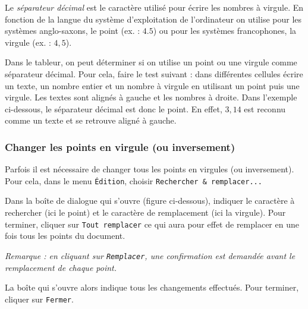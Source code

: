 Le \emph{séparateur décimal} est le caractère utilisé pour écrire les nombres à virgule. En fonction de la langue du système d'exploitation de l'ordinateur on utilise pour les systèmes anglo-saxons, le point (ex. : $4.5$) ou pour les systèmes francophones, la virgule (ex. : $4,5$).

\vspace{6pt}

Dans le tableur, on peut déterminer si on utilise un point ou une virgule comme séparateur décimal. Pour cela, faire le test suivant : dans différentes cellules écrire un texte, un nombre entier et un nombre à virgule en utilisant un point puis une virgule. Les textes sont alignés à gauche et les nombres à droite. Dans l'exemple ci-dessous, le séparateur décimal est donc le point. En effet, $3,14$ est reconnu comme un texte et se retrouve aligné à gauche. 




\subsubsection{Changer les points en virgule (ou inversement)}

Parfois il est nécessaire de changer tous les points en virgules (ou inversement). Pour cela, dans le menu \texttt{Édition}, choisir \texttt{Rechercher \& remplacer...}


Dans la boîte de dialogue qui s'ouvre (figure ci-dessous), indiquer le caractère à rechercher  (ici le point) et le caractère de remplacement  (ici la virgule). Pour terminer, cliquer sur \texttt{Tout remplacer}  ce qui aura pour effet de remplacer en une fois tous les points du document.

\emph{Remarque : en cliquant sur \texttt{Remplacer}, une confirmation est demandée avant le remplacement de chaque point.}


La boîte qui s'ouvre alors indique tous les changements effectués. Pour terminer, cliquer sur \texttt{Fermer}.



